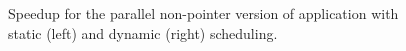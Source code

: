 \begin{figure}[!htp]
	\begin{center}
		\caption{Speedup for the parallel non-pointer version of \tth application with static (left) and dynamic (right) scheduling.}
		\label{fig:RegularSpeedup}
	\end{center}
\end{figure}

